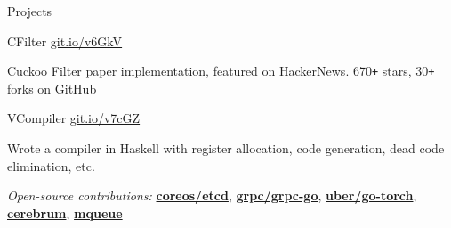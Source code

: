 \documentclass{resume} %
\begin{document}
\begin{rSection}{Projects}
  \begin{rSubsection}{CFilter}
    {\href{https://git.io/v6GkV}{git.io/v6GkV}}
                     {}{}

       \item Cuckoo Filter paper implementation, featured on
         \href{https://news.ycombinator.com/item?id=12241332}{\underline
         {HackerNews}}. 670\texttt{+}
         stars, 30\texttt{+} forks on GitHub
  \end{rSubsection}

  \begin{rSubsection}{VCompiler}
    {\href{https://git.io/v7cGZ}{git.io/v7cGZ}}
                     {}{}
                   \item Wrote a compiler in Haskell with register allocation, code generation,
                     dead code elimination, etc.
  \end{rSubsection}

  \begin{rMinisection}
    \item {\em Open-source contributions:}
      \href{https://github.com/coreos/etcd/pull/8288}{\textbf{coreos/etcd}},
      \href{https://github.com/grpc/grpc-go/pull/1478}{\textbf{grpc/grpc-go}},
      \href{https://github.com/uber/go-torch/pull/62}{\textbf{uber/go-torch}},
      \href{https://rubygems.org/gems/cerebrum}{\textbf{cerebrum}},
      \href{https://rubygems.org/gems/mqueue}{\textbf{mqueue}}
  \end{rMinisection}
\end{rSection}
\end{document}
